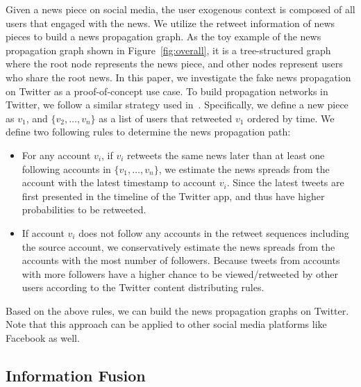 \documentclass[sigconf]{acmart}
\begin{document}
Given a news piece on social media, the user exogenous context is composed of all users that engaged with the news. We utilize the retweet information of news pieces to build a news propagation graph.
As the toy example of the news propagation graph shown in Figure~\ref{fig:overall}, it is a tree-structured graph where the root node represents the news piece, and other nodes represent users who share the root news.
In this paper, we investigate the fake news propagation on Twitter as a proof-of-concept use case.
To build propagation networks in Twitter, we follow a similar strategy used in~\cite{shu2020hierarchical, monti2019fake, han2020graph}.
Specifically, we define a new piece as $v_{1}$, and $\{v_2, \dotsc, v_n\}$ as a list of users that retweeted $v_{1}$ ordered by time. We define two following rules to determine the news propagation path:

\begin{itemize}[leftmargin=*]
    \item For any account $v_i$, if $v_i$ retweets the same news later than at least one following accounts in $\{v_1, \dotsc, v_n\}$, we estimate the news spreads from the account with the latest timestamp to account $v_i$.
    Since the latest tweets are first presented in the timeline of the Twitter app, and thus have higher probabilities to be retweeted.
    
    \item If account $v_i$ does not follow any accounts in the retweet sequences including the source account, we conservatively estimate the news spreads from the accounts with the most number of followers.
    Because tweets from accounts with more followers have a higher chance to be viewed/retweeted by other users according to the Twitter content distributing rules. 
\end{itemize}
Based on the above rules, we can build the news propagation graphs on Twitter.
Note that this approach can be applied to other social media platforms like Facebook as well.


\subsection{Information Fusion}
\label{sec03:fusion}
\end{document}
